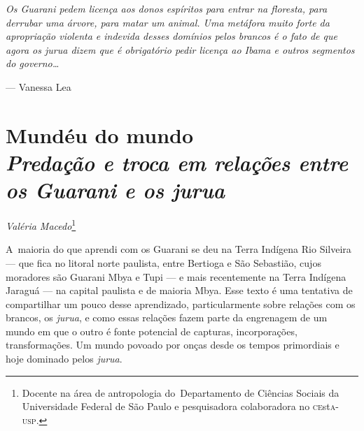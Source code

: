 \clearpage

\vspace*{\fill}

\begin{flushright}
\begin{minipage}[c]{0.85\textwidth}
\raggedleft
\footnotesize
\emph{Os Guarani pedem licença aos donos espíritos para entrar na floresta,
para derrubar uma árvore, para matar um animal. Uma metáfora muito
forte da apropriação violenta e indevida desses domínios pelos brancos é o fato de
que agora os jurua dizem que é obrigatório pedir licença ao Ibama e
outros segmentos do governo\ldots{}}

\smallskip
\hspace*{\fill}--- Vanessa Lea
\end{minipage}
\end{flushright}

\thispagestyle{empty}

\chapter*{Mundéu do mundo\\ 
\large{\emph{Predação e troca em relações entre os Guarani e os \emph{jurua}}}}


\begin{flushright}
\emph{Valéria Macedo}\footnote{Docente na área de antropologia
do~Departamento de Ciências Sociais da Universidade Federal de São
Paulo e pesquisadora colaboradora no \textsc{ce}st\textsc{a}-\textsc{usp}.}
\end{flushright}
\medskip

\noindent A~maioria do que aprendi com os Guarani se deu na Terra Indígena Rio
Silveira --- que fica no litoral norte paulista, entre Bertioga e São
Sebastião, cujos moradores são Guarani Mbya e Tupi --- e mais
recentemente na Terra Indígena Jaraguá --- na capital paulista e de
maioria Mbya. Esse texto é uma tentativa de compartilhar um pouco desse
aprendizado, particularmente sobre relações com os brancos, os \emph{jurua}, e
como essas relações fazem parte da engrenagem de um mundo em que o
outro é fonte potencial de capturas, incorporações, transformações. Um
mundo povoado por onças desde os tempos primordiais e hoje dominado
pelos \emph{jurua}. 

